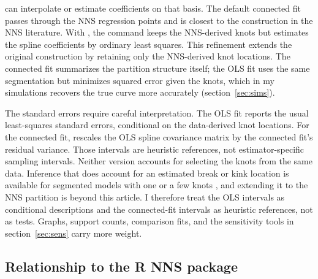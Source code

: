 \documentclass[bib]{statapress}
\begin{document}
 can interpolate or estimate coefficients on that basis.  The
default connected fit passes through the NNS regression points and is closest
to the construction in the NNS literature.  With , the
command keeps the
NNS-derived knots but estimates the spline coefficients by ordinary least
squares.  This refinement extends the original construction by retaining only
the NNS-derived knot locations.  The
connected fit summarizes the partition structure itself; the OLS fit uses the
same segmentation but minimizes squared error given the knots, which in my
simulations recovers the true curve more accurately (section~\ref{sec:sims}).

The standard errors require careful interpretation.  The OLS fit reports the
usual least-squares standard errors, conditional on the data-derived knot
locations.  For the connected fit,  rescales the OLS spline
covariance matrix by the connected fit's residual variance.  Those intervals
are heuristic references, not estimator-specific sampling intervals.  Neither
version accounts for selecting the knots from the same data.  Inference that
does account for an estimated break or
kink location is available for segmented models with one or a few knots
\citep{muggeo_2003,hansen_2017_kink}, and extending it to the NNS partition
is beyond this article.  I therefore treat the OLS intervals as conditional
descriptions and the connected-fit intervals as heuristic references, not as
tests.  Graphs, support counts, comparison fits, and the sensitivity tools in
section~\ref{sec:sens} carry more weight.

\subsection{Relationship to the R NNS package}
\label{sec:rpackage}
\end{document}

